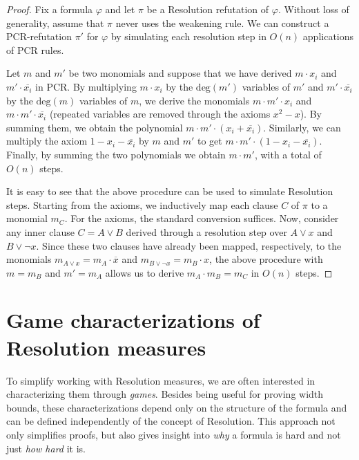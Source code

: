 \begin{proof}
    Fix a formula $\varphi$ and let $\pi$ be a Resolution refutation of $\varphi$. Without loss of generality, assume that $\pi$ never uses the weakening rule. We can construct a PCR-refutation $\pi'$ for $\varphi$ by simulating each resolution step in $O(n)$ applications of PCR rules.

    Let $m$ and $m'$ be two monomials and suppose that we have derived $m \cdot x_i$ and $m' \cdot \overline{x_i}$ in PCR. By multiplying $m \cdot x_i$ by the $\mathrm{deg}(m')$ variables of $m'$ and $m' \cdot \overline{x_i}$ by the $\mathrm{deg}(m)$ variables of $m$, we derive the monomials $m \cdot m' \cdot x_i$ and $m \cdot m' \cdot \overline{x_i}$ (repeated variables are removed through the axioms $x^2 - x$). By summing them, we obtain the polynomial $m \cdot m' \cdot (x_i + \overline{x_i})$. Similarly, we can multiply the axiom $1 - x_i - \overline{x_i}$ by $m$ and $m'$ to get $m \cdot m' \cdot (1 - x_i - \overline{x_i})$. Finally, by summing the two polynomials we obtain $m \cdot m'$, with a total of $O(n)$ steps.

    It is easy to see that the above procedure can be used to simulate Resolution steps. Starting from the axioms, we inductively map each clause $C$ of $\pi$ to a monomial $m_C$. For the axioms, the standard conversion suffices. Now, consider any inner clause $C = A \lor B$ derived through a resolution step over $A \lor x$ and $B \lor \lnot x$. Since these two clauses have already been mapped, respectively, to the monomials $m_{A \lor x} = m_A \cdot \overline{x}$ and $m_{B \lor \lnot x} = m_B \cdot x$, the above procedure with $m = m_B$ and $m' = m_A$ allows us to derive $m_A \cdot m_B = m_C$ in $O(n)$ steps.
\end{proof}

\section{Game characterizations of Resolution measures}
\label{sec:resolution_games}

To simplify working with Resolution measures, we are often interested in characterizing them through \textit{games}. Besides being useful for proving width bounds, these characterizations depend only on the structure of the formula and can be defined independently of the concept of Resolution. This approach not only simplifies proofs, but also gives insight into \textit{why} a formula is hard and not just \textit{how hard} it is.

